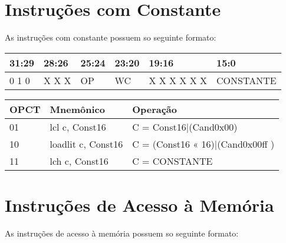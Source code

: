\documentclass{report}
\begin{document}
\section{Instruções com Constante}
As instruções com constante possuem so seguinte formato:

   \FloatBarrier
    \begin{table}[H]
      \begin{center}
        \begin{tabular}[pos]{|m{2cm}|m{2cm}|m{2cm}|m{2cm}|m{2cm}|m{5cm}|} 
          \hline
          \cellcolor[gray]{0.9}\textbf{31:29} & \cellcolor[gray]{0.9}\textbf{28:26} &
          \cellcolor[gray]{0.9}\textbf{25:24} &
          \cellcolor[gray]{0.9}\textbf{23:20} &
          \cellcolor[gray]{0.9}\textbf{19:16} &
          \cellcolor[gray]{0.9}\textbf{15:0} \\ \hline
            0 1 0 & X X X & OP & WC & X X X X X X & CONSTANTE \\ \hline
        \end{tabular}
      \end{center}
    \end{table}  

   \FloatBarrier
    \begin{table}[H]
      \begin{center}
        \begin{tabular}[pos]{|m{}|m{}|m{8cm}|}  
          \hline
          \cellcolor[gray]{0.9}\textbf{OPCT} & 
          \cellcolor[gray]{0.9}\textbf{Mnemônico} &
          \cellcolor[gray]{0.9}\textbf{Operação} \\ \hline
            01 & lcl c, Const16 & C = Const16|(Cand0x00) \\ \hline
            10 & loadlit c, Const16 & C = (Const16 « 16)|(Cand0x00ff ) \\ \hline
            11 & lch c, Const16 & C = CONSTANTE \\ \hline
        \end{tabular}
      \end{center}
    \end{table}  
  
  
\section{Instruções de Acesso à Memória}
As instruções de acesso à memória possuem so seguinte formato:
\end{document}
